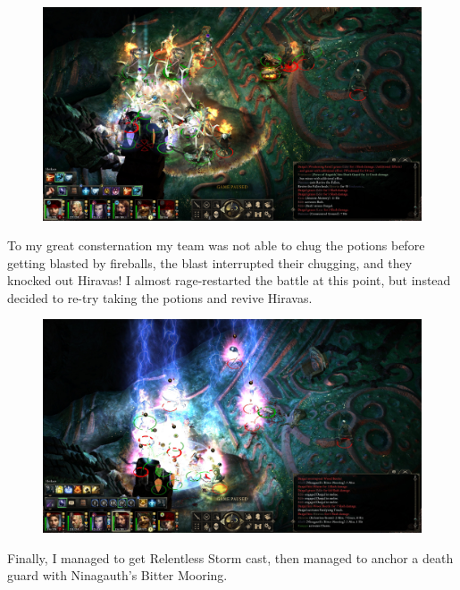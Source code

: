 \documentclass{article}
\begin{document}
\begin{figure}
\includegraphics[scale=0.33]{files/blog/2018_11_25_pillars_of_eternity_path_of_the_damned_act_ii/2018_11_25_fampyr10.jpg}
\end{figure}

To my great consternation my team was not able to chug the potions before getting blasted by fireballs, the blast interrupted their chugging, and they knocked out Hiravas!  I almost rage-restarted the battle at this point, but instead decided to re-try taking the potions and revive Hiravas.

\begin{figure}
\includegraphics[scale=0.33]{files/blog/2018_11_25_pillars_of_eternity_path_of_the_damned_act_ii/2018_11_25_fampyr11.jpg}
\end{figure}

Finally, I managed to get Relentless Storm cast, then managed to anchor a death guard with Ninagauth's Bitter Mooring.
\end{document}
